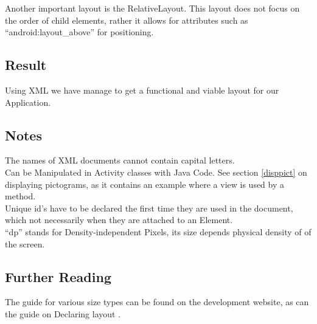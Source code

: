 Another important layout is the RelativeLayout. 
This layout does not focus on the order of child elements, rather it allows for attributes such as ``android:layout\_above'' for positioning.

\subsection*{Result}

Using XML we have manage to get a functional and viable layout for our Application.

\subsection*{Notes}
The names of XML documents cannot contain capital letters.\\
Can be Manipulated in Activity classes with Java Code.
See section \ref{disppict} on displaying pictograms, as it contains an example where a view is used by a method.\\
Unique id's have to be declared the first time they are used in the document, which not necessarily when they are attached to an Element.\\
``dp'' stands for Density-independent Pixels, its size depends physical density of of the screen.

\subsection*{Further Reading}
The guide for various size types can be found on the development website\cite{othertypes}, as can the guide on Declaring layout \cite{declayout}.